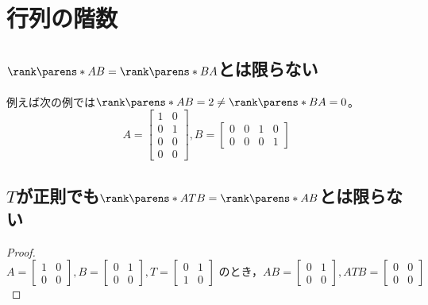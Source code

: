 \chapter{行列の階数}
    \section{\texorpdfstring{$\rank\parens*{AB}=\rank\parens*{BA}$}{rank(AB)=rank(BA)}とは限らない}
        例えば次の例では$\rank\parens*{AB} = 2 \neq \rank\parens*{BA}=0$。
        \[
            A =
            \begin{bmatrix}
                1 & 0 \\
                0 & 1 \\
                0 & 0 \\
                0 & 0
            \end{bmatrix},
            B = \begin{bmatrix}
                0 & 0 & 1 & 0 \\
                0 & 0 & 0 & 1
            \end{bmatrix}
        \]
    \section{\texorpdfstring{$T$}{T}が正則でも\texorpdfstring{$\rank\parens*{ATB}=\rank\parens*{AB}$}{rank(ATB) = rank(AB)}とは限らない}
        \begin{proof}
            \[
                A =
                \begin{bmatrix}
                    1 & 0 \\
                    0 & 0
                \end{bmatrix},
                B =
                \begin{bmatrix}
                    0 & 1 \\
                    0 & 0
                \end{bmatrix},
                T =
                \begin{bmatrix}
                    0 & 1 \\
                    1 & 0
                \end{bmatrix}
                \text{ のとき，}
                AB =
                \begin{bmatrix}
                    0 & 1 \\
                    0 & 0
                \end{bmatrix},
                ATB =
                \begin{bmatrix}
                    0 & 0 \\
                    0 & 0
                \end{bmatrix}
            \]
        \end{proof}

